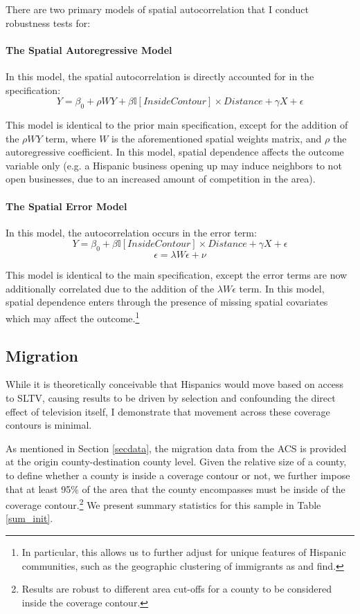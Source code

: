 \documentclass[11pt]{article}
\begin{document}
There are two primary models of spatial autocorrelation that I conduct robustness tests for:

\paragraph{The Spatial Autoregressive Model}

In this model, the spatial autocorrelation is directly accounted for in the specification:
\[ Y = \beta_0 + \rho W Y + \beta \mathbb{I}[InsideContour] \times Distance + \gamma X + \epsilon \]

This model is identical to the prior main specification, except for the addition of the $\rho W Y$ term, where $W$ is the aforementioned spatial weights matrix, and $\rho$ the autoregressive coefficient. In this model, spatial dependence affects the outcome variable only (e.g. a Hispanic business opening up may induce neighbors to not open businesses, due to an increased amount of competition in the area).

\paragraph{The Spatial Error Model}

In this model, the autocorrelation occurs in the error term:
\[ Y = \beta_0 + \beta \mathbb{I}[InsideContour] \times Distance + \gamma X + \epsilon \]
\[\epsilon = \lambda W \epsilon + \nu\]

This model is identical to the main specification, except the error terms are now additionally correlated due to the addition of the $\lambda W \epsilon$ term. In this model, spatial dependence enters through  the presence of missing spatial covariates which may affect the outcome.\footnote{ In particular, this allows us to further adjust for unique features of Hispanic communities, such as the geographic clustering of immigrants as \cite{cutler_when_2008} and \cite{cascio_cracks_2012} find.}

\subsection{Migration}

While it is theoretically conceivable that Hispanics would move based on access to SLTV, causing results to be driven by selection and confounding the direct effect of television itself, I demonstrate that movement across these coverage contours is minimal.

As mentioned in Section \ref{secdata}, the migration data from the ACS is provided at the origin county-destination county level. Given the relative size of a county, to define whether a county is inside a coverage contour or not, we further impose that at least 95\% of the area that the county encompasses must be inside of the coverage contour.\footnote{ Results are robust to different area cut-offs for a county to be considered inside the coverage contour.} We present summary statistics for this sample in Table \ref{sum_init}.
\end{document}
